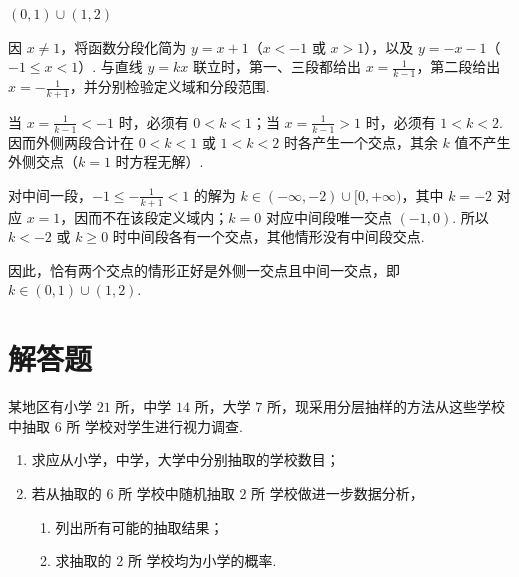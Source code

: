\begin{answer}
\((0,1) \cup (1,2)\)
\end{answer}

\begin{solution}
因 \(x\ne1\)，将函数分段化简为 \(y=x+1\)（\(x<-1\) 或 \(x>1\)），以及 \(y=-x-1\)（\(-1\leqslant x<1\)）. 与直线 \(y=kx\) 联立时，第一、三段都给出 \(x=\frac{1}{k-1}\)，第二段给出 \(x=-\frac{1}{k+1}\)，并分别检验定义域和分段范围.

当 \(x=\frac{1}{k-1}<-1\) 时，必须有 \(0<k<1\)；当 \(x=\frac{1}{k-1}>1\) 时，必须有 \(1<k<2\). 因而外侧两段合计在 \(0<k<1\) 或 \(1<k<2\) 时各产生一个交点，其余 \(k\) 值不产生外侧交点（\(k=1\) 时方程无解）.

对中间一段，\(-1\leqslant-\frac{1}{k+1}<1\) 的解为 \(k\in(-\infty,-2)\cup[0,+\infty)\)，其中 \(k=-2\) 对应 \(x=1\)，因而不在该段定义域内；\(k=0\) 对应中间段唯一交点 \((-1,0)\). 所以 \(k<-2\) 或 \(k\geqslant0\) 时中间段各有一个交点，其他情形没有中间段交点.

因此，恰有两个交点的情形正好是外侧一交点且中间一交点，即 \(k\in(0,1)\cup(1,2)\).
\end{solution}

\section{解答题}

\begin{problem}
某地区有小学 \(21\text{ 所}\)，中学 \(14\text{ 所}\)，大学 \(7\text{ 所}\)，现采用分层抽样的方法从这些学校中抽取 \(6\text{ 所}\) 学校对学生进行视力调查.
\begin{enumerate}
\item 求应从小学，中学，大学中分别抽取的学校数目；
\item 若从抽取的 \(6\text{ 所}\) 学校中随机抽取 \(2\text{ 所}\) 学校做进一步数据分析，
\begin{enumerate}
\item 列出所有可能的抽取结果；
\item 求抽取的 \(2\text{ 所}\) 学校均为小学的概率.
\end{enumerate}
\end{enumerate}
\end{problem}

